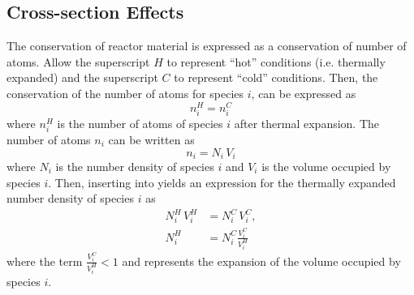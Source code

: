   \subsection{Cross-section Effects}
    \label{sec:cross-section_effects}
    The conservation of reactor material is expressed as a conservation of 
    number of atoms. Allow the superscript $H$ to represent ``hot'' conditions 
    (i.e.  thermally expanded) and the superscript $C$ to represent ``cold'' 
    conditions.  Then, the conservation of the number of atoms for species $i$, 
    can be expressed as
    \begin{equation}
      \label{eq:conservation}
      n_i^H = n_i^C 
    \end{equation}
    where $n_i^H$ is the number of atoms of species $i$ after thermal expansion.
    The number of atoms $n_i$ can be written as 
    \begin{equation}
      \label{eq:nden_definition}
      n_i = N_i \, V_i
    \end{equation}
    where $N_i$ is the number density of species $i$ and $V_i$ is the volume
    occupied by species $i$. Then, inserting  into 
     yields an expression for the thermally expanded 
    number density of species $i$ as
    \begin{align}
      N_i^H \, V_i^H &= N_i^C \, V_i^C, \\
      \label{eq:nden_volume_ratio}
      N_i^H &= N_i^C \frac{V_i^C}{V_i^H}
    \end{align}
    where the term $\frac{V_i^C}{V_i^H} < 1$ and represents the expansion of the
    volume occupied by species $i$. 

